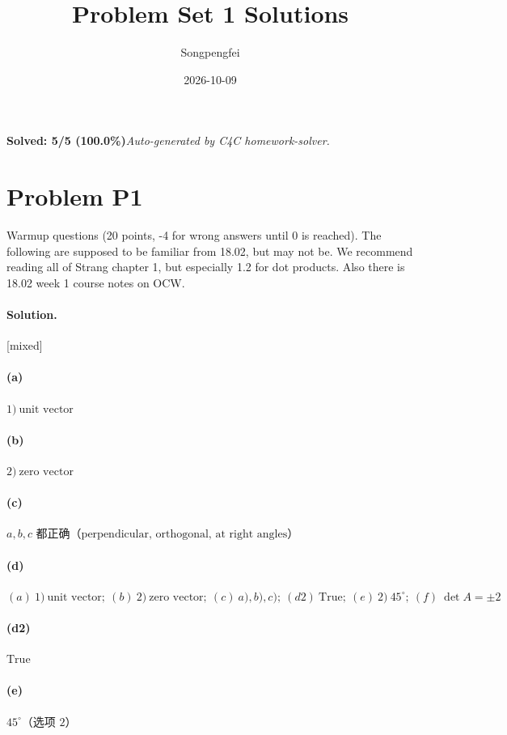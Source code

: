\documentclass[11pt,a4paper]{article}
\title{Problem Set 1 Solutions}
\author{Songpengfei}
\date{2026-10-09}
\newcommand{\solvertag}[1]{{\footnotesize\color{gray}\textsf{[#1]}}}
\begin{document}
\maketitle

\noindent\textbf{Solved: 5/5 (100.0\%)}\quad\textit{Auto-generated by C4C homework-solver.}

\section*{Problem P1}
Warmup questions (20 points, -4 for wrong answers until 0 is reached).
The following are supposed to be familiar from 18.02, but may not be. We recommend
reading all of Strang chapter 1, but especially 1.2 for dot products. Also there is 18.02
week 1 course notes on OCW.

\paragraph{Solution.} \solvertag{mixed} 

\paragraph{(a)} $1)\ \text{unit vector}$

\paragraph{(b)} $2)\ \text{zero vector}$

\paragraph{(c)} $a, b, c \text{ 都正确（perpendicular, orthogonal, at right angles）}$

\paragraph{(d)} $(a)\ 1)\ \text{unit vector};\ (b)\ 2)\ \text{zero vector};\ (c)\ a),b),c);\ (d2)\ \text{True};\ (e)\ 2)\ 45^\circ;\ (f)\ \det A=\pm 2$

\paragraph{(d2)} $\text{True}$

\paragraph{(e)} $45^\circ\text{（选项 2）}$
\end{document}
